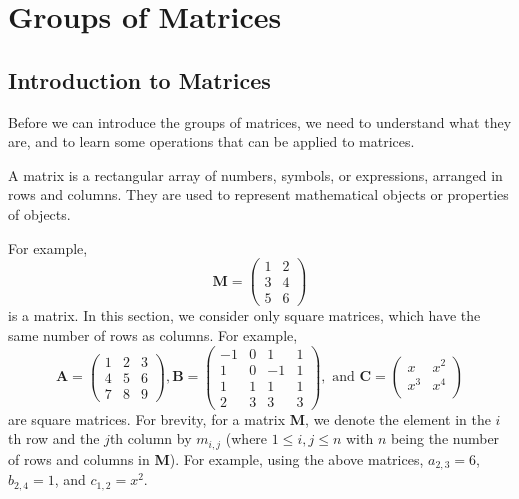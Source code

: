 \section{Groups of Matrices}
\subsection{Introduction to Matrices}\label{subsection-intro-to-matrices}
Before we can introduce the groups of matrices, we need to understand what they are, and to learn some operations that can be applied to matrices.

A matrix is a rectangular array of numbers, symbols, or expressions, arranged in rows and columns. They are used to represent mathematical objects or properties of objects.

For example,
\[
    \textbf{M} = \begin{pmatrix}
    1 & 2\\
    3 & 4\\
    5 & 6
    \end{pmatrix}
\]
is a matrix. In this section, we consider only square matrices, which have the same number of rows as columns. For example,
\[
    \textbf{A} = \begin{pmatrix}
    1 & 2 & 3\\
    4 & 5 & 6\\
    7 & 8 & 9
    \end{pmatrix}, \textbf{B} = \begin{pmatrix}
    -1 & 0 & 1 & 1\\
    1 & 0 & -1 & 1\\
    1 & 1 & 1 & 1\\
    2 & 3 & 3 & 3
    \end{pmatrix}, \textrm{ and } \textbf{C} = \begin{pmatrix}
    x & x^2\\
    x^3 & x^4\\
    \end{pmatrix}
\]
are square matrices. For brevity, for a matrix \textbf{M}, we denote the element in the $i$th row and the $j$th column by $m_{i,j}$ (where $1 \leq i, j \leq n$ with $n$ being the number of rows and columns in \textbf{M}). For example, using the above matrices, $a_{2,3} = 6$, $b_{2,4}=1$, and $c_{1,2} = x^2$.

